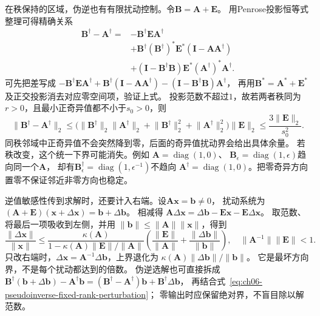 在秩保持的区域，伪逆也有有限扰动控制。令$\bm B=\bm A+\bm E$。
用Penrose投影恒等式整理可得精确关系
\[
 \begin{aligned}
 \bm B^\dagger-\bm A^\dagger
 ={}&-\bm B^\dagger\bm E\bm A^\dagger\\
 &+\bm B^\dagger(\bm B^\dagger)^*\bm E^*(\bm I-\bm A\bm A^\dagger)\\
 &+(\bm I-\bm B^\dagger\bm B)\bm E^*(\bm A^\dagger)^*\bm A^\dagger.
 \end{aligned}
\]
可先把差写成
$-\bm B^\dagger\bm E\bm A^\dagger+
\bm B^\dagger(\bm I-\bm A\bm A^\dagger)
-(\bm I-\bm B^\dagger\bm B)\bm A^\dagger$，
再用$\bm B^*=\bm A^*+\bm E^*$及正交投影消去对应零空间项，验证上式。
投影范数不超过$1$，故若两者秩同为$r>0$，且最小正奇异值都不小于$s_0>0$，则
\begin{equation}
 \lVert\bm B^\dagger-\bm A^\dagger\rVert_2
 \leq\bigl(\lVert\bm B^\dagger\rVert_2\lVert\bm A^\dagger\rVert_2
          +\lVert\bm B^\dagger\rVert_2^2
          +\lVert\bm A^\dagger\rVert_2^2\bigr)\lVert\bm E\rVert_2
 \leq\frac{3\lVert\bm E\rVert_2}{s_0^2}.
 \label{eq:ch06-pseudoinverse-fixed-rank-perturbation}
\end{equation}
同秩邻域中正奇异值不会突然降到零，后面的奇异值扰动界会给出具体余量。
若秩改变，这个统一下界可能消失。例如
$\bm A=\operatorname{diag}(1,0)$、
$\bm B_\epsilon=\operatorname{diag}(1,\epsilon)$趋向同一个$\bm A$，
却有$\bm B_\epsilon^\dagger=\operatorname{diag}(1,\epsilon^{-1})$不趋向
$\bm A^\dagger=\operatorname{diag}(1,0)$。把零奇异方向置零不保证邻近非零方向也稳定。

逆值敏感性传到求解时，还要计入右端。设$\bm A\bm x=\bm b\neq0$，
扰动系统为$(\bm A+\bm E)(\bm x+\Delta\bm x)=\bm b+\Delta\bm b$。
相减得
$\bm A\Delta\bm x=\Delta\bm b-\bm E\bm x-\bm E\Delta\bm x$。
取范数、将最后一项吸收到左侧，并用
$\lVert\bm b\rVert\leq\lVert\bm A\rVert\lVert\bm x\rVert$，得到
\begin{equation}
 \frac{\lVert\Delta\bm x\rVert}{\lVert\bm x\rVert}
 \leq
 \frac{\kappa(\bm A)}
 {1-\kappa(\bm A)\lVert\bm E\rVert/\lVert\bm A\rVert}
 \left(\frac{\lVert\bm E\rVert}{\lVert\bm A\rVert}
       +\frac{\lVert\Delta\bm b\rVert}{\lVert\bm b\rVert}\right),
 \quad \lVert\bm A^{-1}\rVert\lVert\bm E\rVert<1.
 \label{eq:matrix-analysis-linear-system-perturbation}
\end{equation}
只改右端时，$\Delta\bm x=\bm A^{-1}\Delta\bm b$，上界退化为
$\kappa(\bm A)\lVert\Delta\bm b\rVert/\lVert\bm b\rVert$。
它是最坏方向界，不是每个扰动都达到的倍数。
伪逆选解也可直接拆成
$\bm B^\dagger(\bm b+\Delta\bm b)-\bm A^\dagger\bm b
=(\bm B^\dagger-\bm A^\dagger)\bm b+\bm B^\dagger\Delta\bm b$，
再结合式~\eqref{eq:ch06-pseudoinverse-fixed-rank-perturbation}；
零输出时应保留绝对界，不盲目除以解范数。

